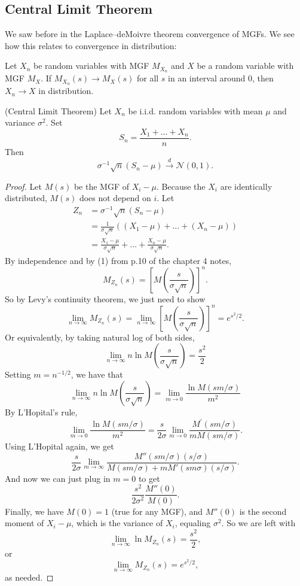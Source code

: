 \documentclass{ximera}
\begin{document}
\subsection{Central Limit Theorem}

We saw before in the Laplace--deMoivre theorem convergence of MGFs. We see how this relates to convergence in distribution:
\begin{theorem}
Let $X_n$ be random variables with MGF $M_{X_n}$ and $X$ be a random variable with MGF $M_X$. 
If $M_{X_n}(s) \rightarrow M_X(s)$ for all $s$ in an interval around $0$, then $X_n\rightarrow X$ in distribution.
\end{theorem}
\begin{theorem}
(Central Limit Theorem)
Let $X_n$ be i.i.d. random variables with mean $\mu$ and variance $\sigma^2$. Set 
$$
S_n = \frac{X_1 + \ldots + X_n}{n}. 
$$
Then
$$
\sigma^{-1} \sqrt{n}(S_n - \mu) \stackrel{d}{\rightarrow} \mathcal{N}(0,1).
$$
\end{theorem}
\begin{proof}
Let $M(s)$ be the MGF of $X_i - \mu$. Because the $X_i$ are identically distributed, $M(s)$ does not depend on $i$. Let
\begin{align*}
Z_n &= \sigma^{-1} \sqrt{n}(S_n - \mu)  \\
&= \frac{1}{\sigma \sqrt{n}}( (X_1 - \mu) + \ldots + (X_n- \mu))\\
&= \frac{X_1-\mu}{\sigma \sqrt{n}} + \ldots + \frac{X_n - \mu}{\sigma \sqrt{n}}.
\end{align*}
By independence and by (1) from p.10 of the chapter 4 notes, 
$$
M_{Z_n}(s) = \left[ M\left( \frac{s}{\sigma \sqrt{n}}\right)\right]^n.
$$ 
So by Levy's continuity theorem, we just need to show
$$
\lim_{n\rightarrow \infty} M_{Z_n}(s) = \lim_{n\rightarrow\infty} \left[ M\left( \frac{s}{\sigma \sqrt{n}}\right)\right]^n = e^{s^2/2}.
$$
Or equivalently, by taking natural log of both sides,
$$
\lim _{n \rightarrow \infty} n \ln M\left(\frac{s}{\sigma \sqrt{n}}\right)=\frac{s^{2}}{2}
$$
Setting $m=n^{-1/2}$, we have that
$$
\lim _{n \rightarrow \infty} n \ln M\left(\frac{s}{\sigma \sqrt{n}}\right)=
\lim _{m \rightarrow 0} \frac{\ln {M}\left(s{m} / \sigma\right)}{m^{2}}
$$
By L'Hopital's rule, 
$$
\lim _{m \rightarrow 0} \frac{\ln {M}\left(s{m} / \sigma\right)}{m^{2}} = \frac{s}{2 \sigma} \lim_{m \rightarrow 0} \frac{M^{\prime}\left(s{m} / \sigma\right)}{m M\left(sm / \sigma\right)}.
$$
Using L'Hopital again, we get
$$
\frac{s}{2\sigma} \lim_{m\rightarrow\infty} \frac{M''(sm/\sigma) (s/\sigma)}{M(sm/\sigma) + m M'(sm\sigma)(s/\sigma)}.
$$
And now we can just plug in $m=0$ to get
$$
\frac{s^2}{2\sigma^2} \frac{ M''(0)}{M(0)}.
$$
Finally, we have $M(0)=1$ (true for any MGF), and $M''(0)$ is the second moment of $X_i- \mu$, which is the variance of $X_i$, equaling $\sigma^2$. So we are left with 
$$
\lim_{n\rightarrow \infty} \ln M_{Z_n}(s) = \frac{s^2}{2},
$$
or 
$$
\lim_{n\rightarrow \infty} M_{Z_n}(s) = e^{s^2/2},
$$
as needed.
\end{proof}
\end{document}

